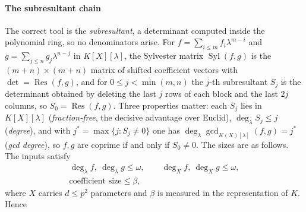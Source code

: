 \paragraph{The subresultant chain}
The correct tool is the \emph{subresultant}, a determinant computed inside the polynomial ring, so no
denominators arise. For $f=\sum_{i\le m}f_i\lambda^{m-i}$ and $g=\sum_{j\le n}g_j\lambda^{n-j}$ in
$K[X][\lambda]$, the Sylvester matrix $\operatorname{Syl}(f,g)$ is the $(m+n)\times(m+n)$ matrix of
shifted coefficient vectors with $\det=\operatorname{Res}(f,g)$, and for $0\le j<\min(m,n)$ the $j$-th
subresultant $S_j$ is the determinant obtained by deleting the last $j$ rows of each block and the last
$2j$ columns, so $S_0=\operatorname{Res}(f,g)$. Three properties matter: each $S_j$ lies in
$K[X][\lambda]$ (\emph{fraction-free}, the decisive advantage over Euclid), $\deg_\lambda S_j\le j$
(\emph{degree}), and with $j^{*}=\max\{j:S_j\neq0\}$ one has
$\deg_\lambda\gcd_{K(X)[\lambda]}(f,g)=j^{*}$ (\emph{gcd degree}), so $f,g$ are coprime if and only if
$S_0\neq0$. The sizes are as follows. The inputs satisfy
\begin{equation}\label{appBC:eq:sizesin}
\begin{gathered}
\deg_\lambda f,\ \deg_\lambda g\le\omega,\qquad
\deg_X f,\ \deg_X g\le\omega,\\
\text{coefficient size}\le\beta ,
\end{gathered}
\end{equation}
where $X$ carries $d\le p^{2}$ parameters and $\beta$ is measured in the representation of $K$. Hence
